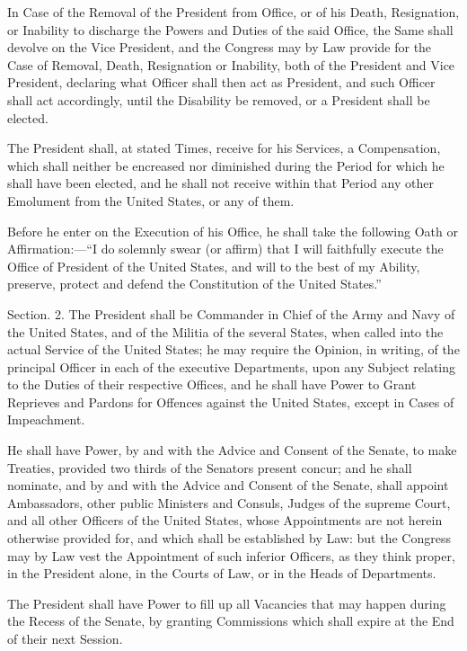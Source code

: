 \documentclass{article}
\begin{document}
In Case of the Removal of the President from Office, or of his Death,
Resignation, or Inability to discharge the Powers and Duties of the said
Office, the Same shall devolve on the Vice President, and the Congress
may by Law provide for the Case of Removal, Death, Resignation or
Inability, both of the President and Vice President, declaring what
Officer shall then act as President, and such Officer shall act
accordingly, until the Disability be removed, or a President shall be
elected.

The President shall, at stated Times, receive for his Services, a
Compensation, which shall neither be encreased nor diminished during the
Period for which he shall have been elected, and he shall not receive
within that Period any other Emolument from the United States, or any of
them.

Before he enter on the Execution of his Office, he shall take the
following Oath or Affirmation:—“I do solemnly swear (or affirm) that I
will faithfully execute the Office of President of the United States,
and will to the best of my Ability, preserve, protect and defend the
Constitution of the United States.”

Section. 2.  The President shall be Commander in Chief of the Army and Navy of
the United States, and of the Militia of the several States, when called into
the actual Service of the United States; he may require the Opinion, in writing,
of the principal Officer in each of the executive Departments, upon any Subject
relating to the Duties of their respective Offices, and he shall have Power to
Grant Reprieves and Pardons for Offences against the United States, except in
Cases of Impeachment.

He shall have Power, by and with the Advice and Consent of the Senate,
to make Treaties, provided two thirds of the Senators present concur;
and he shall nominate, and by and with the Advice and Consent of the
Senate, shall appoint Ambassadors, other public Ministers and Consuls,
Judges of the supreme Court, and all other Officers of the United
States, whose Appointments are not herein otherwise provided for, and
which shall be established by Law: but the Congress may by Law vest the
Appointment of such inferior Officers, as they think proper, in the
President alone, in the Courts of Law, or in the Heads of Departments.

The President shall have Power to fill up all Vacancies that may happen
during the Recess of the Senate, by granting Commissions which shall
expire at the End of their next Session.
\end{document}
